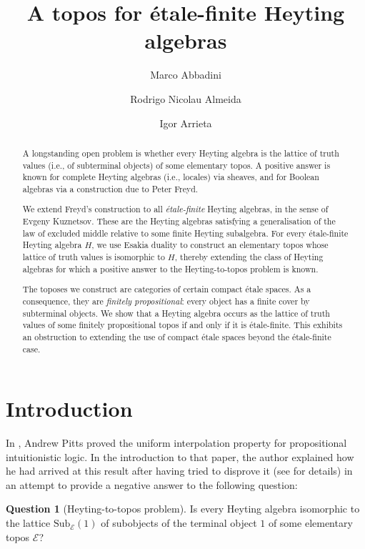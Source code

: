 \documentclass[12pt]{amsart}
\title{A topos for étale-finite Heyting algebras}
\author{Marco Abbadini}
\author{Rodrigo Nicolau Almeida}
\author{Igor Arrieta}
\theoremstyle{plain}
\theoremstyle{definition}
\newtheorem{question}[theorem]{Question}
\newcommand{\E}{\mathcal{E}}
\newcommand{\Sub}{\mathrm{Sub}}
\begin{document}
\begin{abstract}
    A longstanding open problem is whether every Heyting algebra is the lattice of truth values (i.e., of subterminal objects) of some elementary topos. A positive answer is known for complete Heyting algebras (i.e., locales) via sheaves, and for Boolean algebras via a construction due to Peter Freyd.

    We extend Freyd's construction to all \emph{étale-finite} Heyting algebras, in the sense of Evgeny Kuznetsov. These are the Heyting algebras satisfying a generalisation of the law of excluded middle relative to some finite Heyting subalgebra.
    For every étale-finite Heyting algebra $H$, we use Esakia duality to construct an elementary topos whose lattice of truth values is isomorphic to $H$, thereby extending the class of Heyting algebras for which a positive answer to the Heyting-to-topos problem is known.
    
    The toposes we construct are categories of certain compact étale spaces.
    As a consequence, they are \emph{finitely propositional}: every object has a finite cover by subterminal objects.
    We show that a Heyting algebra occurs as the lattice of truth values of some finitely propositional topos if and only if it is étale-finite. 
    This exhibits an obstruction to extending the use of compact étale spaces beyond the étale-finite case.
\end{abstract}
\maketitle
\tableofcontents


\section{Introduction}

In \cite{Pitts1992}, Andrew Pitts proved the uniform interpolation property for propositional intuitionistic logic. In the introduction to that paper, the author explained how he had arrived at this result after having tried to disprove it (see \cite[Prop.~17]{vangooluniforminterpolation} for details) in an attempt to provide a negative answer to the following question:


\begin{question}[Heyting-to-topos problem]\label{q: pitts question}
    Is every Heyting algebra isomorphic to the lattice $\Sub_{\E}(1)$ of subobjects of the terminal object $1$ of some elementary topos $\E$?
\end{question}
\end{document}
